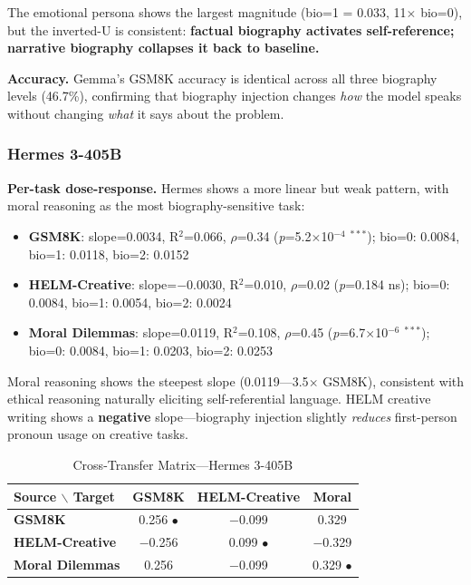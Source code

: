 \documentclass[11pt,a4paper]{article}
\begin{document}
The emotional persona shows the largest magnitude (bio=1 = 0.033, 11$\times$ bio=0), but the inverted-U is consistent: \textbf{factual biography activates self-reference; narrative biography collapses it back to baseline.}

\textbf{Accuracy.} Gemma's GSM8K accuracy is identical across all three biography levels (46.7\%), confirming that biography injection changes \textit{how} the model speaks without changing \textit{what} it says about the problem.

\subsubsection{Hermes 3-405B}

\textbf{Per-task dose-response.} Hermes shows a more linear but weak pattern, with moral reasoning as the most biography-sensitive task:
\begin{itemize}[nosep]
\item \textbf{GSM8K}: slope=0.0034, R$^2$=0.066, $\rho$=0.34 (\textit{p}=5.2$\times$10$^{-4}$ $^{***}$); bio=0: 0.0084, bio=1: 0.0118, bio=2: 0.0152
\item \textbf{HELM-Creative}: slope=$-$0.0030, R$^2$=0.010, $\rho$=0.02 (\textit{p}=0.184 ns); bio=0: 0.0084, bio=1: 0.0054, bio=2: 0.0024
\item \textbf{Moral Dilemmas}: slope=0.0119, R$^2$=0.108, $\rho$=0.45 (\textit{p}=6.7$\times$10$^{-6}$ $^{***}$); bio=0: 0.0084, bio=1: 0.0203, bio=2: 0.0253
\end{itemize}

Moral reasoning shows the steepest slope (0.0119---3.5$\times$ GSM8K), consistent with ethical reasoning naturally eliciting self-referential language. HELM creative writing shows a \textbf{negative} slope---biography injection slightly \textit{reduces} first-person pronoun usage on creative tasks.

\begin{table}[H]
\centering
\caption{Cross-Transfer Matrix---Hermes 3-405B}
\label{tab:ct_hermes}
\begin{tabular}{lccc}
\toprule
\textbf{Source $\backslash$ Target} & \textbf{GSM8K} & \textbf{HELM-Creative} & \textbf{Moral} \\
\midrule
\textbf{GSM8K} & 0.256 $\bullet$ & $-$0.099 & 0.329 \\
\textbf{HELM-Creative} & $-$0.256 & 0.099 $\bullet$ & $-$0.329 \\
\textbf{Moral Dilemmas} & 0.256 & $-$0.099 & 0.329 $\bullet$ \\
\bottomrule
\end{tabular}
\end{table}
\end{document}
